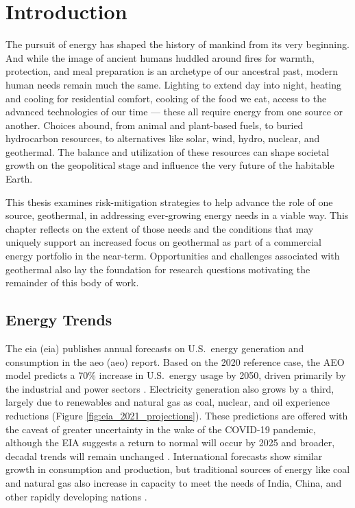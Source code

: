 \chapter{Introduction}\label{ch1:intro}
The pursuit of energy has shaped the history of mankind from its very beginning. And while the image of ancient humans huddled around fires for warmth, protection, and meal preparation is an archetype of our ancestral past, modern human needs remain much the same. Lighting to extend day into night, heating and cooling for residential comfort, cooking of the food we eat, access to the advanced technologies of our time --- these all require energy from one source or another. Choices abound, from animal and plant-based fuels, to buried hydrocarbon resources, to alternatives like solar, wind, hydro, nuclear, and geothermal. The balance and utilization of these resources can shape societal growth on the geopolitical stage and influence the very future of the habitable Earth.

This thesis examines risk-mitigation strategies to help advance the role of one source, geothermal, in addressing ever-growing energy needs in a viable way. This chapter reflects on the extent of those needs and the conditions that may uniquely support an increased focus on geothermal as part of a commercial energy portfolio in the near-term. Opportunities and challenges associated with geothermal also lay the foundation for research questions motivating the remainder of this body of work.

\section{Energy Trends}\label{ch1:trends}
The \acrlong{eia} (\acrshort{eia}) publishes annual forecasts on U.S.\ energy generation and consumption in the \acrlong{aeo} (\acrshort{aeo}) report. Based on the 2020 reference case, the AEO model predicts a 70\% increase in U.S.\ energy usage by 2050, driven primarily by the industrial and power sectors \citep{eia_annual_2021}. Electricity generation also grows by a third, largely due to renewables and natural gas as coal, nuclear, and oil experience reductions (Figure \ref{fig:eia_2021_projections}). These predictions are offered with the caveat of greater uncertainty in the wake of the COVID-19 pandemic, although the EIA suggests a return to normal will occur by 2025 and broader, decadal trends will remain unchanged \citep{eia_annual_2021}. International forecasts show similar growth in consumption and production, but traditional sources of energy like coal and natural gas also increase in capacity to meet the needs of India, China, and other rapidly developing nations \citep{eia_international_2020}. 
 
